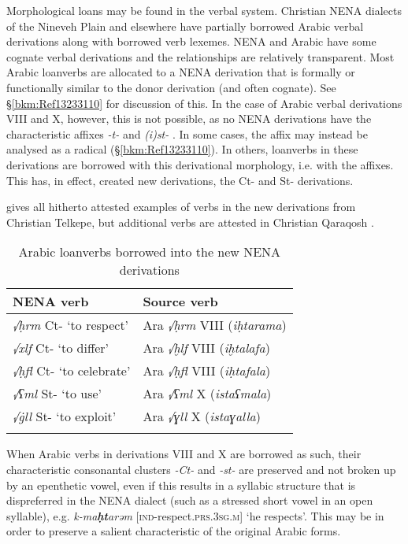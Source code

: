 \documentclass[output=paper]{langsci/langscibook}
\begin{document}
Morphological loans may be found in the verbal system. Christian NENA dialects of the Nineveh Plain and elsewhere have partially borrowed Arabic verbal derivations along with borrowed verb lexemes. NENA and Arabic have some cognate verbal derivations and the relationships are relatively transparent. Most Arabic loanverbs are allocated to a NENA derivation that is formally or functionally similar to the donor derivation (and often cognate). See §\ref{bkm:Ref13233110} for discussion of this. In the case of Arabic verbal derivations VIII and X, however, this is not possible, as no NENA derivations have the characteristic affixes \textit{{}-t-} and \textit{(i)st-} . In some cases, the affix may instead be analysed as a radical (§\ref{bkm:Ref13233110}). In others, loanverbs in these derivations are borrowed with this derivational morphology, i.e. with the affixes. This has, in effect, created new derivations, the Ct- and St- derivations.

 gives all hitherto attested examples of verbs in the new derivations from Christian Telkepe, but additional verbs are attested in Christian Qaraqosh \citep[130]{Khan2002}.

\begin{table}
\caption{Arabic loanverbs borrowed into the new NENA derivations\label{tab:coghill:1}}
\begin{tabularx}{.75\textwidth}{QQ}
\lsptoprule
{NENA verb} & {Source verb}\\\midrule
{\textit{√ḥrm} Ct- ‘to respect’} & {Ara \textit{√ḥrm} VIII (\textit{iḥtarama})}\\
\textit{√xlf} Ct- ‘to differ’ & {Ara \textit{√ḫlf} VIII (\textit{iḫtalafa})}\\
{\textit{√ḥfl} Ct- ‘to celebrate’} & {Ara \textit{√ḥfl} VIII (\textit{iḥtafala})}\\
{\textit{√ʕml} St- ‘to use’} & {Ara \textit{√ʕml} X (\textit{istaʕmala})}\\
\textit{√\.gll} St- ‘to exploit’ & {Ara \textit{√ɣll} X (\textit{istaɣalla})}\\
\lspbottomrule
\end{tabularx}
\end{table}

When Arabic verbs in derivations VIII and X are borrowed as such, their characteristic consonantal clusters \textit{{}-Ct-} and \textit{{}-st-} are preserved and not broken up by an epenthetic vowel, even if this results in a syllabic structure that is dispreferred in the NENA dialect (such as a stressed short vowel in an open syllable), e.g. \textit{k-ma}\textbf{\textit{ḥt}}\kern -1pt\textit{arəm} [\textsc{ind}\nobreakdash-respect.\textsc{prs.}3\textsc{sg.m}] ‘he respects’. This may be in order to preserve a salient characteristic of the original Arabic forms.
\end{document}
